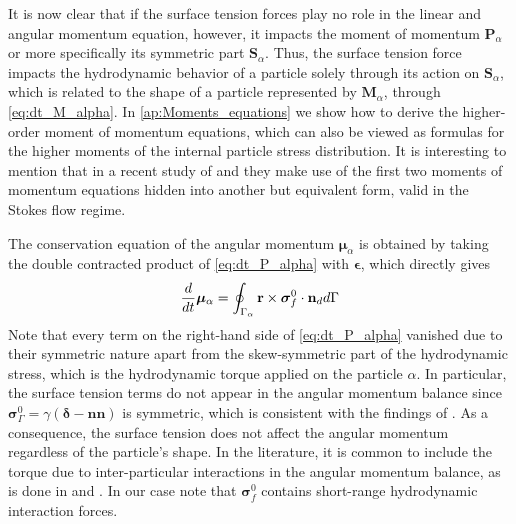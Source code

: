 It is now clear that if the surface tension forces play no role in the linear and angular momentum equation, however, it impacts the moment of momentum $\textbf{P}_\alpha$ or more specifically its symmetric part $\textbf{S}_\alpha$.
Thus, the surface tension force impacts the hydrodynamic behavior of a particle solely through its action on $\textbf{S}_\alpha$, which is related to the shape of a particle represented by $\textbf{M}_\alpha$, through \ref{eq:dt_M_alpha}.
In \ref{ap:Moments_equations} we show how to derive the higher-order moment of momentum equations, which can also be viewed as formulas for the higher moments of the internal particle stress distribution. 
It is interesting to mention that in a recent study of \citet{dolata2021faxen} and \citet{zhou2020lamb} they make use of the first two moments of momentum equations hidden into another but equivalent form, valid in the Stokes flow regime. 





The conservation equation of the angular momentum $\bm{\mu}_\alpha$ is obtained by taking the double contracted product of \ref{eq:dt_P_alpha} with $\bm\epsilon$, which directly gives
\begin{equation}
    \ddt\bm{\mu}_\alpha
    =  
    \intS{ \textbf{r} \times \bm{\sigma}_f^0\cdot \textbf{n}_d }
    \label{eq:dt_mu_alpha}
\end{equation}
Note that every term on the right-hand side of \ref{eq:dt_P_alpha} vanished due to their symmetric nature apart from the skew-symmetric part of the hydrodynamic stress, which is the hydrodynamic torque applied on the particle $\alpha$.
In particular, the surface tension terms do not appear in the angular momentum balance since $\bm\sigma_\Gamma^0 = \gamma (\bm\delta-\textbf{nn})$ is symmetric, which is consistent with the findings of \citet{hesla1993note}. 
As a consequence, the surface tension does not affect the angular momentum regardless of the particle's shape. 
In the literature, it is common to include the torque due to inter-particular interactions in the angular momentum balance, as is done in \citet{jackson1997locally} and \citet{zhang1997momentum}.
In our case note that $\bm{\sigma}_f^0$ contains short-range hydrodynamic interaction forces. 


